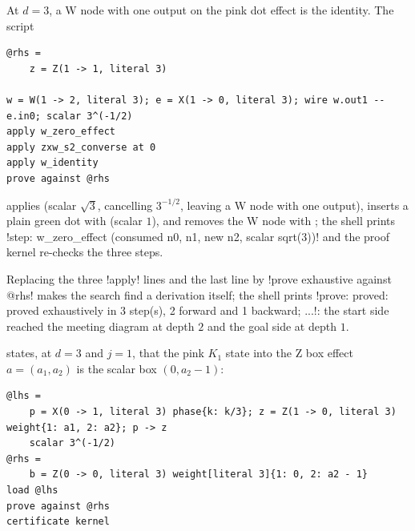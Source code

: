 \begin{example}\label{ex:completeness-l38}
At $d=3$, a W node with one output on the pink dot effect is the identity. The script
\begin{lstlisting}[style=azx]
@rhs =
    z = Z(1 -> 1, literal 3)

w = W(1 -> 2, literal 3); e = X(1 -> 0, literal 3); wire w.out1 -- e.in0; scalar 3^(-1/2)
apply w_zero_effect
apply zxw_s2_converse at 0
apply w_identity
prove against @rhs
\end{lstlisting}
applies  (scalar $\sqrt3$, cancelling $3^{-1/2}$, leaving a W node with one
output), inserts a plain green dot with  (scalar $1$), and removes the W
node with ; the shell prints \code!step: w_zero_effect (consumed n0, n1, new n2, scalar sqrt(3))!
and the proof kernel re-checks the three steps.
\end{example}

\begin{example}\label{ex:completeness-l38x}
Replacing the three \azx!apply! lines and the last line by \azx!prove exhaustive against @rhs! makes
the search find a derivation itself; the shell prints
\code!prove: proved: proved exhaustively in 3 step(s), 2 forward and 1 backward; ...!: the start side
reached the meeting diagram at depth $2$ and the goal side at depth $1$.
\end{example}

\begin{example}[Lemma 7 of {[P1]}]\label{ex:completeness-l7}
 states, at $d=3$ and $j=1$, that the pink $K_1$ state into the Z box
effect $a=(a_1,a_2)$ is the scalar box $(0,a_2-1)$:
\begin{lstlisting}[style=azx]
@lhs =
    p = X(0 -> 1, literal 3) phase{k: k/3}; z = Z(1 -> 0, literal 3) weight{1: a1, 2: a2}; p -> z
    scalar 3^(-1/2)
@rhs =
    b = Z(0 -> 0, literal 3) weight[literal 3]{1: 0, 2: a2 - 1}
load @lhs
prove against @rhs
certificate kernel
\end{lstlisting}
\end{example}
